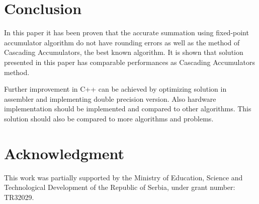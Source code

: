 \documentclass[conference]{IEEEtran}
\begin{document}
\section{Conclusion}
In this paper it has been proven
that the accurate summation using fixed-point accumulator 
algorithm do not have rounding errors as well as the method of Cascading Accumulators,
the best known algorithm.
It is shown that solution presented in this paper has comparable performances as Cascading Accumulators method.
\par
Further improvement in C++ can be achieved by optimizing 
solution in assembler and implementing double precision version.
Also hardware implementation should be implemented and compared to other algorithms.
This solution should also be compared to more algorithms and problems. 

\section*{Acknowledgment}
This work was partially supported by the Ministry of Education, 
Science and Technological Development of the Republic of Serbia, 
under grant number: TR32029.




\end{document}
